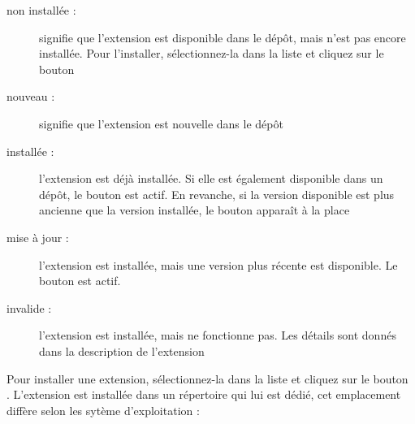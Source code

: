 \begin{description}
\item[non installée :]signifie que l'extension est disponible dans le dépôt, mais n'est pas encore installée. Pour l'installer, sélectionnez-la dans la liste et cliquez sur le bouton\\ 
\item[nouveau :] signifie que l'extension est nouvelle dans le dépôt
\item[installée :] l'extension est déjà installée. Si elle est également disponible dans un dépôt, le bouton  est actif. En revanche, si la version disponible est plus ancienne que la version installée, le bouton  apparaît à la place
\item[mise à jour :] l'extension est installée, mais une version plus récente est disponible. Le bouton  est actif.
\item[invalide :] l'extension est installée, mais ne fonctionne pas. Les détails sont donnés dans la description de l'extension
\end{description}


Pour installer une extension, sélectionnez-la dans la liste et cliquez sur le bouton\\ . L'extension est installée dans un répertoire qui lui est dédié, cet emplacement diffère selon les sytème d'exploitation :

